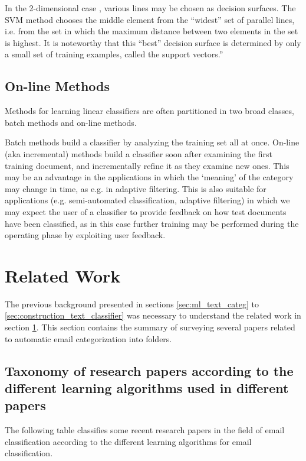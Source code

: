 In the 2-dimensional case , various lines may be chosen as decision surfaces. 
The SVM method chooses the middle element from the ``widest'' set of parallel 
lines, i.e. from the set in which the maximum distance between two elements in 
the set is highest. It is noteworthy that this ``best'' decision surface is 
determined by only a small set of training examples, called the support vectors.''\cite{Sebastiani2002}

\subsection{On-line Methods}
Methods for learning linear classifiers are often partitioned in two broad 
classes, batch methods and on-line methods.

Batch methods build a classifier by analyzing the training set all at once. 
On-line (aka incremental) methods build a classifier soon after examining 
the first training document, and incrementally refine it as they examine new ones. 
This may be an advantage in the applications in which the `meaning' of the 
category may change in time, as e.g. in adaptive filtering. This is also suitable 
for applications (e.g. semi-automated classification, adaptive filtering) in 
which we may expect the user of a classifier to provide feedback on how test 
documents have been classified, as in this case further training may be performed 
during the operating phase by exploiting user feedback.

\section{Related Work}
\label{sec:related_work}
The previous background presented in sections \ref{sec:ml_text_categ} to \ref{sec:construction_text_classifier} was necessary to understand the related work in section \ref{sec:related_work}. This section contains the summary of surveying several papers related to automatic email categorization into folders.

\subsection{Taxonomy of research papers according to the different learning algorithms used in different papers}
The following table classifies some recent research papers in the field of email 
classification according to the different learning algorithms for email classification.

